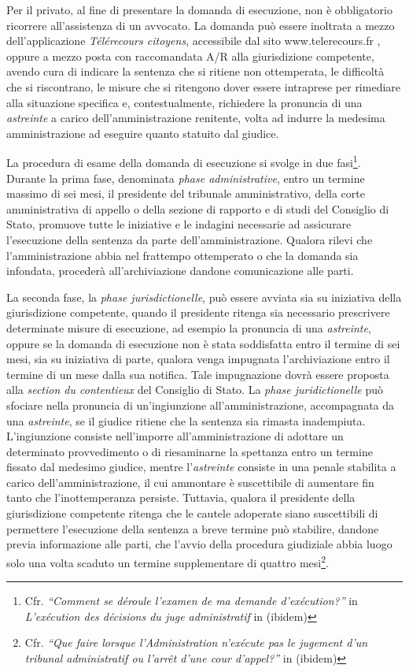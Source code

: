 \documentclass[12pt,it,a4paper,]{report}
\begin{document}
Per il privato, al fine di presentare la domanda di esecuzione, non è
obbligatorio ricorrere all'assistenza di un avvocato. La domanda può
essere inoltrata a mezzo dell'applicazione \emph{Télérecours citoyens},
accessibile dal sito www.telerecours.fr , oppure a mezzo posta con
raccomandata A/R alla giurisdizione competente, avendo cura di indicare
la sentenza che si ritiene non ottemperata, le difficoltà che si
riscontrano, le misure che si ritengono dover essere intraprese per
rimediare alla situazione specifica e, contestualmente, richiedere la
pronuncia di una \emph{astreinte} a carico dell'amministrazione
renitente, volta ad indurre la medesima amministrazione ad eseguire
quanto statuito dal giudice.

La procedura di esame della domanda di esecuzione si svolge in due
fasi\footnote{Cfr. \emph{``Comment se déroule l'examen de ma demande
  d'exécution?''} in \emph{L'exécution des décisions du juge
  administratif} in (ibidem)}. Durante la prima fase, denominata
\emph{phase administrative}, entro un termine massimo di sei mesi, il
presidente del tribunale amministrativo, della corte amministrativa di
appello o della sezione di rapporto e di studi del Consiglio di Stato,
promuove tutte le iniziative e le indagini necessarie ad assicurare
l'esecuzione della sentenza da parte dell'amministrazione. Qualora
rilevi che l'amministrazione abbia nel frattempo ottemperato o che la
domanda sia infondata, procederà all'archiviazione dandone comunicazione
alle parti.

La seconda fase, la \emph{phase jurisdictionelle}, può essere avviata
sia su iniziativa della giurisdizione competente, quando il presidente
ritenga sia necessario prescrivere determinate misure di esecuzione, ad
esempio la pronuncia di una \emph{astreinte}, oppure se la domanda di
esecuzione non è stata soddisfatta entro il termine di sei mesi, sia su
iniziativa di parte, qualora venga impugnata l'archiviazione entro il
termine di un mese dalla sua notifica. Tale impugnazione dovrà essere
proposta alla \emph{section du contentieux} del Consiglio di Stato. La
\emph{phase juridictionelle} può sfociare nella pronuncia di
un'ingiunzione all'amministrazione, accompagnata da una
\emph{astreinte}, se il giudice ritiene che la sentenza sia rimasta
inadempiuta. L'ingiunzione consiste nell'imporre all'amministrazione di
adottare un determinato provvedimento o di riesaminarne la spettanza
entro un termine fissato dal medesimo giudice, mentre l'\emph{astreinte}
consiste in una penale stabilita a carico dell'amministrazione, il cui
ammontare è suscettibile di aumentare fin tanto che l'inottemperanza
persiste. Tuttavia, qualora il presidente della giurisdizione competente
ritenga che le cautele adoperate siano suscettibili di permettere
l'esecuzione della sentenza a breve termine può stabilire, dandone
previa informazione alle parti, che l'avvio della procedura giudiziale
abbia luogo solo una volta scaduto un termine supplementare di quattro
mesi\footnote{Cfr. \emph{``Que faire lorsque l'Administration n'exécute
  pas le jugement d'un tribunal administratif ou l'arrêt d'une cour
  d'appel?''} in (ibidem)}.
\end{document}
